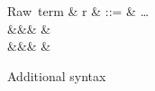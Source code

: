 \begin{figure}
\begin{syntaxfig}
\mbox{Raw term}
&
r
&
::=
&
\ldots
\\
&&&
\exLambda{\sigma}
&
\\
&&&
&
\end{syntaxfig}
\caption{Additional syntax}
\end{figure}
